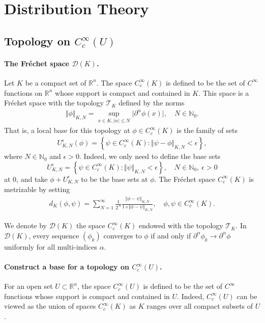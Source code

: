\documentclass{article}
\numberwithin{equation}{section}
\newcommand{\bbN}{\mathbb{N}}
\newcommand{\bbR}{\mathbb{R}}
\newcommand{\scr}{\mathscr}
\renewcommand{\cal}{\mathcal}
\theoremstyle{plain}
\theoremstyle{definition}
\begin{document}
\section{Distribution Theory}
\subsection{Topology on $C^\infty_c(U)$}
\paragraph{The Fréchet space $\cal{D}(K)$.} Let $K$ be a compact set of $\bbR^n$. The space $C_c^\infty(K)$ is defined to be the set of $C^\infty$ functions on $\bbR^n$ whose support is compact and contained in $K$. This space is a Fréchet space with the topology $\mathscr{T}_K$ defined by the norms
\begin{align*}
	\Vert\phi\Vert_{K,N}=\sup_{x\in K,\vert\alpha\vert\leq N}\vert\partial^\alpha\phi(x)\vert,\quad N\in\bbN_0.
\end{align*}
That is, a local base for this topology at $\phi\in C_c^\infty(K)$ is the family of sets
\begin{align*}
	U_{K,N}^\epsilon(\phi)=\left\{\psi\in C_c^\infty(K):\Vert\psi-\phi\Vert_{K,N}<\epsilon\right\},
\end{align*}
where $N\in\bbN_0$ and $\epsilon>0$.  Indeed, we only need to define the base sets  $$U_{K,N}^\epsilon=\left\{\psi\in C_c^\infty(K):\Vert\psi\Vert_{K,N}<\epsilon\right\},\quad N\in\bbN_0,\ \epsilon>0$$ at $0$, and take $\phi+U_{K,N}^\epsilon$ to be the base sets at $\phi$. The Fréchet space $C_c^\infty(K)$ is metrizable by setting
\begin{align*}
	d_K(\phi,\psi)=\sum_{N=1}^\infty\frac{1}{2^N}\frac{\Vert\phi-\psi\Vert_{K,N}}{1+\Vert\phi-\psi\Vert_{K,N}},\quad\phi,\psi\in C_c^\infty(K).
\end{align*}

We denote by $\cal{D}(K)$ the space $C^\infty_c(K)$ endowed with the topology $\scr{T}_K$. In $\cal{D}(K)$, every sequence $(\phi_k)$ converges to $\phi$ if and only if $\partial^\alpha\phi_k\to\partial^\alpha\phi$ uniformly for all multi-indices $\alpha$. 


\paragraph{Construct a base for a topology on $C_c^\infty(U)$.} For an open set $U\subset\bbR^n$, the space $C_c^\infty(U)$ is defined to be the set of $C^\infty$ functions whose support is compact and contained in $U$. Indeed, $C_c^\infty(U)$ can be viewed as the union of spaces $C_c^\infty(K)$ as $K$ ranges over all compact subsets of $U$. 
\end{document}
